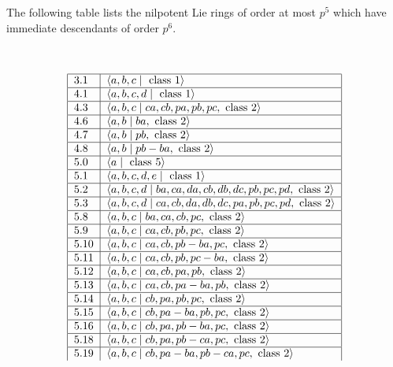 \documentclass[10pt]{article}
\begin{document}
The following table lists the nilpotent Lie rings of order at most $p^{5}$
which have immediate descendants of order $p^{6}$.

{\ }

{\small 
\[
\begin{tabular}{|l|l|}
\hline
3.1 & $\langle a,b,c\;|\;\text{ class }1\rangle $ \\ \hline
4.1 & $\langle a,b,c,d\;|\;\text{ class }1\rangle $ \\ \hline
4.3 & $\langle a,b,c\;|\;ca,cb,pa,pb,pc,\text{ class }2\rangle $ \\ \hline
4.6 & $\langle a,b\;|\;ba,\text{ class }2\rangle $ \\ \hline
4.7 & $\langle a,b\;|\;pb,\text{ class }2\rangle $ \\ \hline
4.8 & $\langle a,b\;|\;pb-ba,\text{ class }2\rangle $ \\ \hline
5.0 & $\langle a\;|\;\text{ class }5\rangle $ \\ \hline
5.1 & $\langle a,b,c,d,e\;|\;\text{ class }1\rangle $ \\ \hline
5.2 & $\langle a,b,c,d\;|\;ba,ca,da,cb,db,dc,pb,pc,pd,\text{ class }2\rangle 
$ \\ \hline
5.3 & $\langle a,b,c,d\;|\;ca,cb,da,db,dc,pa,pb,pc,pd,\text{ class }2\rangle 
$ \\ \hline
5.8 & $\langle a,b,c\;|\;ba,ca,cb,pc,\text{ class }2\rangle $ \\ \hline
5.9 & $\langle a,b,c\;|\;ca,cb,pb,pc,\text{ class }2\rangle $ \\ \hline
5.10 & $\langle a,b,c\;|\;ca,cb,pb-ba,pc,\text{ class }2\rangle $ \\ \hline
5.11 & $\langle a,b,c\;|\;ca,cb,pb,pc-ba,\text{ class }2\rangle $ \\ \hline
5.12 & $\langle a,b,c\;|\;ca,cb,pa,pb,\text{ class }2\rangle $ \\ \hline
5.13 & $\langle a,b,c\;|\;ca,cb,pa-ba,pb,\text{ class }2\rangle $ \\ \hline
5.14 & $\langle a,b,c\;|\;cb,pa,pb,pc,\text{ class }2\rangle $ \\ \hline
5.15 & $\langle a,b,c\;|\;cb,pa-ba,pb,pc,\text{ class }2\rangle $ \\ \hline
5.16 & $\langle a,b,c\;|\;cb,pa,pb-ba,pc,\text{ class }2\rangle $ \\ \hline
5.18 & $\langle a,b,c\;|\;cb,pa,pb-ca,pc,\text{ class }2\rangle $ \\ \hline
5.19 & $\langle a,b,c\;|\;cb,pa-ba,pb-ca,pc,\text{ class }2\rangle $ \\ 

\end{tabular}\]}
\end{document}
